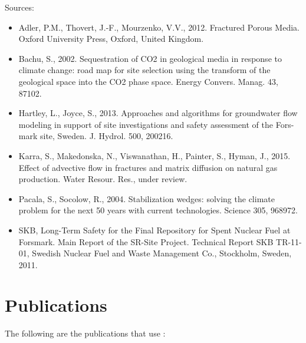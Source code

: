 \documentclass[letterpaper,10pt,english]{sphinxmanual}
\begin{document}
Sources:
\begin{itemize}
\item {} 
Adler, P.M., Thovert, J.-F., Mourzenko, V.V., 2012. Fractured Porous Media. Oxford University Press, Oxford, United Kingdom.

\item {} 
Bachu, S., 2002. Sequestration of CO2 in geological media in response to climate change: road map for site selection using the transform of the geological space into the CO2 phase space. Energy Convers. Manag. 43, 87\textendash{}102.

\item {} 
Hartley, L., Joyce, S., 2013. Approaches and algorithms for groundwater flow modeling in support of site investigations and safety assessment of the Fors- mark site, Sweden. J. Hydrol. 500, 200\textendash{}216.

\item {} 
Karra, S., Makedonska, N., Viswanathan, H., Painter, S., Hyman, J., 2015. Effect of advective flow in fractures and matrix diffusion on natural gas production. Water Resour. Res., under review.

\item {} 
Pacala, S., Socolow, R., 2004. Stabilization wedges: solving the climate problem for the next 50 years with current technologies. Science 305, 968\textendash{}972.

\item {} 
SKB, Long-Term Safety for the Final Repository for Spent Nuclear Fuel at Forsmark. Main Report of the SR-Site Project. Technical Report SKB TR-11-01, Swedish Nuclear Fuel and Waste Management Co., Stockholm, Sweden, 2011.

\end{itemize}


\chapter{Publications}
\label{\detokenize{publications::doc}}\label{\detokenize{publications:publications-chapter}}\label{\detokenize{publications:publications}}
The following are the publications that use :
\begin{figure}[htbp]
\centering

\noindent{}
\end{figure}
\begin{figure}[htbp]
\centering

\noindent{}
\end{figure}



\renewcommand{\indexname}{Index}
\printindex
\end{document}
